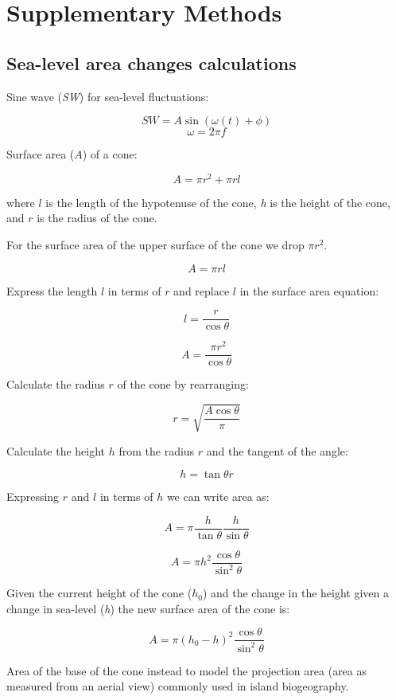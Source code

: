 \section*{Supplementary Methods}
\label{supplementary_methods}

\subsection*{Sea-level area changes calculations}

Sine wave (\textit{SW}) for sea-level fluctuations:


\[ SW = A \sin(\omega(t) + \phi) \]    
\[ \omega = 2 \pi f \]

Surface area ($A$) of a cone:

\[ A = \pi r^2 + \pi r l \]

where $l$ is the length of the hypotenuse of the cone, \textit{h} is the height of the cone, and $r$ is the radius of the cone. 

For the surface area of the upper surface of the cone we drop $\pi r^2$.

\[ A = \pi r l \]

Express the length $l$ in terms of $r$ and replace $l$ in the surface area equation:

\[ l = \frac{r}{\cos \theta} \]

\[ A = \frac{\pi r^2}{\cos \theta} \]

Calculate the radius $r$ of the cone by rearranging: 

\[ r = \sqrt{\frac{A \cos \theta}{\pi}} \]

Calculate the height $h$ from the radius $r$ and the tangent of the angle:

\[ h = \tan \theta r \]

Expressing $r$ and $l$ in terms of $h$ we can write area as: 

\[ A = \pi \frac{h}{\tan \theta} \frac{h}{\sin \theta} \]

\[ A = \pi h^2 \frac{\cos \theta}{\sin^2 \theta} \]

Given the current height of the cone ($h_0$) and the change in the height given a change in sea-level (\textit{h}) the new surface area of the cone is:

\[ A = \pi (h_0 - h)^2 \frac{\cos \theta}{\sin^2 \theta} \]

Area of the base of the cone instead to model the projection area (area as measured from an aerial view) commonly used in island biogeography. \\

